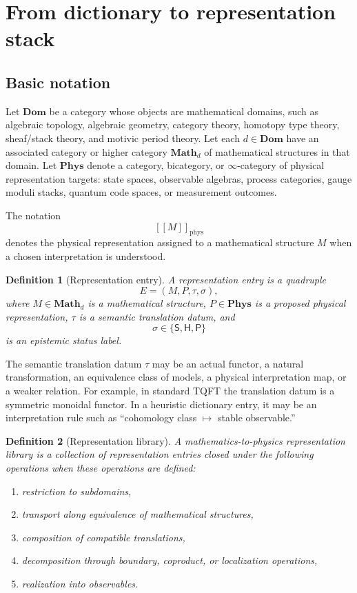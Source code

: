\documentclass[11pt]{article}
\newtheorem{definition}{Definition}[section]
\newcommand{\Phys}{\mathbf{Phys}}
\newcommand{\Math}{\mathbf{Math}}
\newcommand{\Dom}{\mathbf{Dom}}
\newcommand{\Sstd}{\textsf{S}}
\newcommand{\Sheur}{\textsf{H}}
\newcommand{\Pspec}{\textsf{P}}
\newcommand{\physbracket}[1]{[\![ #1 ]\!]_{\mathrm{phys}}}
\begin{document}
\section{From dictionary to representation stack}

\subsection{Basic notation}

Let $\Dom$ be a category whose objects are mathematical domains, such as algebraic topology, algebraic geometry, category theory, homotopy type theory, sheaf/stack theory, and motivic period theory. Let each $d\in\Dom$ have an associated category or higher category $\Math_d$ of mathematical structures in that domain. Let $\Phys$ denote a category, bicategory, or $\infty$-category of physical representation targets: state spaces, observable algebras, process categories, gauge moduli stacks, quantum code spaces, or measurement outcomes.

The notation
\[
\physbracket{M}
\]
denotes the physical representation assigned to a mathematical structure $M$ when a chosen interpretation is understood.

\begin{definition}[Representation entry]
A \emph{representation entry} is a quadruple
\[
E=(M,P,\tau,\sigma),
\]
where $M\in\Math_d$ is a mathematical structure, $P\in\Phys$ is a proposed physical representation, $\tau$ is a semantic translation datum, and
\[
\sigma\in\{\Sstd,\Sheur,\Pspec\}
\]
is an epistemic status label.
\end{definition}

The semantic translation datum $\tau$ may be an actual functor, a natural transformation, an equivalence class of models, a physical interpretation map, or a weaker relation. For example, in standard TQFT the translation datum is a symmetric monoidal functor. In a heuristic dictionary entry, it may be an interpretation rule such as ``cohomology class $\mapsto$ stable observable.''

\begin{definition}[Representation library]
A \emph{mathematics-to-physics representation library} is a collection of representation entries closed under the following operations when these operations are defined:
\begin{enumerate}
    \item restriction to subdomains,
    \item transport along equivalence of mathematical structures,
    \item composition of compatible translations,
    \item decomposition through boundary, coproduct, or localization operations,
    \item realization into observables.
\end{enumerate}
\end{definition}
\end{document}
